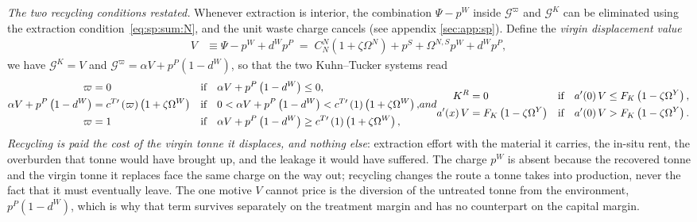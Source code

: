 \emph{The two recycling conditions restated.} Whenever extraction is interior, the combination
$\Psi-p^W$ inside $\mathcal G^\varpi$ and $\mathcal G^K$ can be eliminated using the extraction
condition~\eqref{eq:sp:sum:N}, and the unit waste charge cancels (see appendix \ref{sec:app:sp}). Define the \emph{virgin displacement value}
\begin{align}
V &\equiv \Psi-p^W+d^Wp^P \;=\; C^N_N\left(1+\zeta\Omega^N\right)+p^S+\Omega^{N,S}p^W+d^Wp^P,
\label{eq:sp:sum:V}
\end{align}
we have $\mathcal G^K=V$ and $\mathcal G^\varpi=\alpha V+p^P\left(1-d^W\right)$, so that the two
Kuhn--Tucker systems read
\begin{subequations}
\label{eq:sp:sum:recycling-virgin}
\begin{align}
\varpi &= 0
&&\text{if}\quad \alpha V+p^P\left(1-d^W\right)\le 0,
\notag
\\
\alpha V+p^P\left(1-d^W\right) &= c^{T\prime}\left(\varpi\right)\left(1+\zeta\Omega^W\right)
&&\text{if}\quad 0<\alpha V+p^P\left(1-d^W\right)<c^{T\prime}\left(1\right)\left(1+\zeta\Omega^W\right),
\notag
\\
\varpi &= 1
&&\text{if}\quad \alpha V+p^P\left(1-d^W\right)\ge c^{T\prime}\left(1\right)\left(1+\zeta\Omega^W\right),
\label{eq:sp:sum:recycling-virgin-varpi}
\end{align}
and
\begin{align}
K^R &= 0
&&\text{if}\quad a'\!\left(0\right)V\le F_K\left(1-\zeta\Omega^Y\right),
\notag
\\
a'\!\left(x\right)V &= F_K\left(1-\zeta\Omega^Y\right)
&&\text{if}\quad a'\!\left(0\right)V> F_K\left(1-\zeta\Omega^Y\right).
\label{eq:sp:sum:recycling-virgin-KR}
\end{align}
\end{subequations}
\emph{Recycling is paid the cost of the virgin tonne it displaces, and nothing else}: extraction
effort with the material it carries, the in-situ rent, the overburden that tonne would have brought
up, and the leakage it would have suffered. The charge $p^W$ is absent because the recovered tonne and
the virgin tonne it replaces face the same charge on the way out; recycling changes the route a
tonne takes into production, never the fact that it must eventually leave. The one motive $V$ cannot
price is the diversion of the untreated tonne from the environment, $p^P\left(1-d^W\right)$, which is
why that term survives separately on the treatment margin and has no counterpart on the capital
margin.

